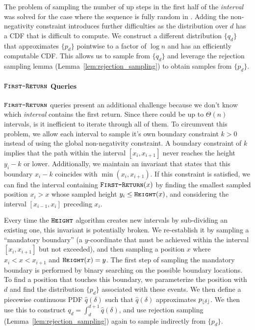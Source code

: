 The problem of sampling the number of up steps in the first half of the \emph{interval} was solved for the case where the sequence is fully random
in \cite{huge}.
Adding the non-negativity constraint introduces further difficulties as the distribution over $d$ has a CDF that is difficult to compute.
We construct a different distribution $\{q_d\}$ that approximates $\{p_d\}$ pointwise to a factor of $\log n$ and has an efficiently computable CDF.
This allows us to sample from $\{q_d\}$ and leverage the rejection sampling lemma (Lemma~\ref{lem:rejection_sampling}) to obtain samples from $\{p_d\}$.

\paragraph*{$\texttt{\textsc{First-Return}}$ Queries}
\label{par:_first-return_queries}
$\texttt{\textsc{First-Return}}$ queries present an additional challenge because we don't know which \emph{interval} contains the first return.
Since there could be up to $\Theta(n)$ intervals, is it inefficient to iterate through all of them.
To circumvent this problem, we allow each interval to sample it's own boundary constraint $k>0$ instead of using the global non-negativity constraint.
A boundary constraint of $k$ implies that the path within the interval $[x_i,x_{i+1}]$ never reaches the height $y_i-k$ or lower.
Additionally, we maintain an invariant that states that this boundary $x_i-k$ coincides with $\min(x_i,x_{i+1})$.
If this constraint is satisfied, we can find the interval containing $\texttt{\textsc{First-Return}}(x)$ by finding the smallest sampled position $x_i>x$
whose sampled height $y_i \le \texttt{\textsc{Height}}(x)$, and considering the interval $[x_{i-1},x_i]$ preceding $x_i$.

Every time the $\texttt{\textsc{Height}}$ algorithm creates new intervals by sub-dividing an existing one, this invariant is potentially broken.
We re-establish it by sampling a ``mandatory boundary'' (a $y$-coordinate that must be achieved within the interval $[x_i,x_{i+1}]$ but not exceeded),
and then sampling a position $x$ where $x_i < x < x_{i+1}$ and $\texttt{\textsc{Height}}(x) = y$.
The first step of sampling the mandatory boundary is performed by binary searching on the possible boundary locations.
To find a position that touches this boundary, we parameterize the position with $d$ and find the distribution $\{p_d\}$ associated with these events.
We then define a piecewise continuous PDF $\hat q(\delta)$ such that $\hat q(\delta)$ approximates $p_{\lfloor\delta\rfloor}$.
We then use this to construct $q_d = \int_d^{d+1}\hat q(\delta)$,
and use rejection sampling (Lemma~\ref{lem:rejection_sampling}) again to sample indirectly from $\{p_d\}$.
